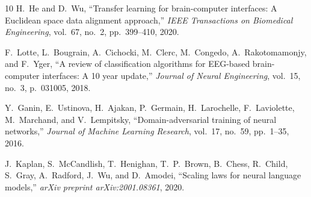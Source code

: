 \documentclass[conference]{IEEEtran}
\begin{document}
\begin{thebibliography}{10}
H.~He and D.~Wu,
``Transfer learning for brain-computer interfaces: A {Euclidean} space data alignment approach,''
\emph{IEEE Transactions on Biomedical Engineering}, vol.~67, no.~2, pp.~399--410, 2020.

F.~Lotte, L.~Bougrain, A.~Cichocki, M.~Clerc, M.~Congedo, A.~Rakotomamonjy, and F.~Yger,
``A review of classification algorithms for {EEG}-based brain-computer interfaces: A 10 year update,''
\emph{Journal of Neural Engineering}, vol.~15, no.~3, p.~031005, 2018.

Y.~Ganin, E.~Ustinova, H.~Ajakan, P.~Germain, H.~Larochelle, F.~Laviolette, M.~Marchand, and V.~Lempitsky,
``Domain-adversarial training of neural networks,''
\emph{Journal of Machine Learning Research}, vol.~17, no.~59, pp.~1--35, 2016.

J.~Kaplan, S.~McCandlish, T.~Henighan, T.~P.~Brown, B.~Chess, R.~Child, S.~Gray, A.~Radford, J.~Wu, and D.~Amodei,
``Scaling laws for neural language models,''
\emph{arXiv preprint arXiv:2001.08361}, 2020.

\end{thebibliography}
\end{document}
